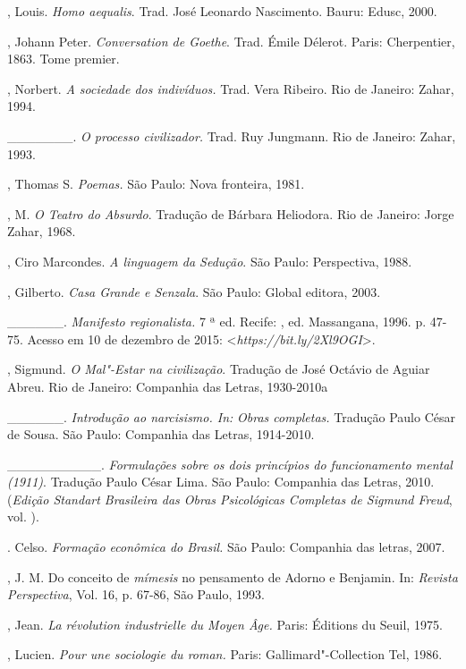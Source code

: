 \begin{Parskip}
, Louis. \emph{Homo aequalis}. Trad. José Leonardo Nascimento. Bauru: Edusc, 2000.

, Johann Peter. \emph{Conversation de Goethe}. Trad. Émile
Délerot. Paris: Cherpentier, 1863. Tome premier.

, Norbert. \emph{A sociedade dos indivíduos.} Trad. Vera Ribeiro.
Rio de Janeiro: Zahar, 1994.

\_\_\_\_\_\_\_. \emph{O processo civilizador.} Trad. Ruy Jungmann. Rio de Janeiro: Zahar, 1993.

, Thomas S. \emph{Poemas.} São Paulo: Nova fronteira, 1981.

, M. \emph{O Teatro do Absurdo}. Tradução de Bárbara
Heliodora. Rio de Janeiro: Jorge Zahar, 1968.

, Ciro Marcondes. \emph{A linguagem da Sedução}. São Paulo:
Perspectiva, 1988.

, Gilberto. \emph{Casa Grande e Senzala}. São Paulo: Global
editora, 2003.

\_\_\_\_\_\_. \emph{Manifesto regionalista.} 7 ª ed. Recife: ,
ed. Massangana, 1996. p. 47-75. Acesso em 10 de dezembro de 2015:
\textless{}\emph{https://bit.ly/2Xl9OGI}\textgreater{}.

, Sigmund. \emph{O Mal"-Estar na civilização}. Tradução de
José Octávio de Aguiar Abreu. Rio de Janeiro: Companhia das Letras,
1930-2010a

\_\_\_\_\_\_. \emph{Introdução ao narcisismo. In:} \emph{Obras
completas.} Tradução Paulo César de Sousa. São Paulo: Companhia das
Letras, 1914-2010.

\_\_\_\_\_\_\_\_\_\_. \emph{Formulações sobre os dois princípios do
funcionamento mental (1911)}. Tradução Paulo César Lima. São Paulo:
Companhia das Letras, 2010. (\emph{Edição Standart Brasileira das Obras
Psicológicas Completas de Sigmund Freud}, vol. ).

. Celso. \emph{Formação econômica do Brasil.} São Paulo:
Companhia das letras, 2007.

, J. M. Do conceito de \emph{mímesis} no pensamento de Adorno e
Benjamin. In: \emph{Revista Perspectiva}, Vol. 16, p. 67-86, São Paulo, 1993.

, Jean. \emph{La révolution industrielle du Moyen Âge.} Paris:
Éditions du Seuil, 1975.

, Lucien. \emph{Pour une sociologie du roman.} Paris:
Gallimard"-Collection Tel, 1986.


\end{Parskip}
